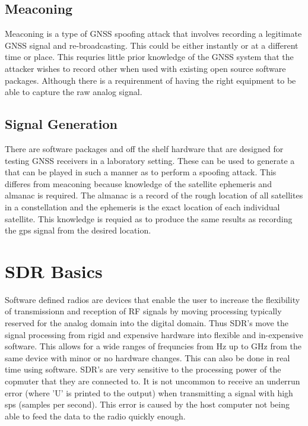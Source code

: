 \subsection{Meaconing}
Meaconing is a type of GNSS spoofing attack that involves recording a legitimate GNSS signal and re-broadcasting. This could be either instantly or at a different time or
place. This requries little prior knowledge of the GNSS system that the attacker wishes to record other when used with existing open source software packages. Although
there is a requirenment of having the right equipment to be able to capture the raw analog signal.

\subsection{Signal Generation}
There are software packages and off the shelf hardware that are designed for testing GNSS receivers in a laboratory setting. These can be used to generate a that can be
played in such a manner as to perform a spoofing attack. This differes from meaconing because knowledge of the satellite ephemeris and almanac is required. The almanac is
a record of the rough location of all satellites in a constellation and the ephemeris is the exact location of each individual satellite. This knowledge is requied as to
produce the same results as recording the gps signal from the desired location.


\section{SDR Basics}
Software defined radios are devices that enable the user to increase the flexibility of transmissionn and reception of RF signals by moving processing typically reserved
for the analog domain into the digital domain. Thus SDR's move the signal processing from rigid and expensive hardware into flexible and in-expensive software. This
allows for a wide ranges of frequncies from Hz up to GHz from the same device with minor or no hardware changes. This can also be done in real time using software.
SDR's are very sensitive to the processing power of the copmuter that they are connected to. It is not uncommon to receive an underrun error (where 'U' is printed to the
output) when transmitting a signal with high sps (samples per second). This error is caused by the host computer not being able to feed the data to the radio quickly
enough.
